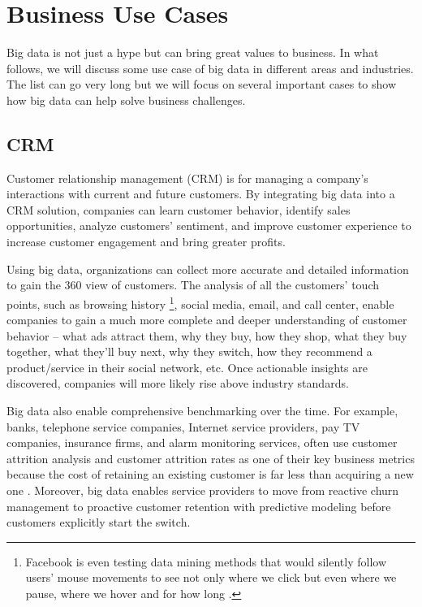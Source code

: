 \documentclass[11pt]{book}
\begin{document}
\section{Business Use Cases}

Big data is not just a hype but can bring great values to business. In what follows, we will discuss some use case of big data in different areas and industries. The list can go very long but we will focus on several important cases to show how big data can help solve business challenges.

\subsection{CRM}
Customer relationship management (CRM) is for managing a company's interactions with current and future customers. By integrating big data into a CRM solution, companies can learn customer behavior, identify sales opportunities, analyze customers' sentiment, and improve customer experience to increase customer engagement and bring greater profits.

Using big data, organizations can collect more accurate and detailed information to gain the 360 view of customers. The analysis of all the customers' touch points, such as browsing history \footnote{Facebook is even testing data mining methods that would silently follow users' mouse movements to see not only where we click but even where we pause, where we hover and for how long \cite{Facebook13Mouse}.}, social media, email, and call center, enable companies to gain a much more complete and deeper understanding of customer behavior -- what ads attract them, why they buy, how they shop, what they buy together, what they'll buy next, why they switch, how they recommend a product/service in their social network, etc. Once actionable insights are discovered, companies will more likely rise above industry standards.

Big data also enable comprehensive benchmarking over the time. For example, banks, telephone service companies, Internet service providers, pay TV companies, insurance firms, and alarm monitoring services, often use customer attrition analysis and customer attrition rates as one of their key business metrics because the cost of retaining an existing customer is far less than acquiring a new one \cite{ReichheldSasser1990}.
Moreover, big data enables service providers to move from reactive churn management to proactive customer retention with predictive modeling before customers explicitly start the switch.
\end{document}
